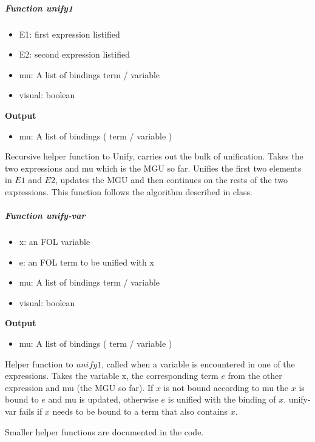 \documentclass[paper=a4, fontsize=11pt]{scrartcl}
\numberwithin{equation}{section}		%
\numberwithin{figure}{section}			%
\numberwithin{table}{section}				%
\begin{document}
\subparagraph{Function unify1}
\begin{itemize}
  \item {E1:} first expression listified
  \item {E2:} second expression listified
  \item {mu:} A list of bindings {term / variable}
  \item {visual:} boolean
\end{itemize}
\noindent\textbf{Output}
\begin{itemize}
    \item{mu:} A list of bindings ( term / variable )
\end{itemize}
Recursive helper function to Unify, carries out the bulk of unification. Takes the two
expressions and mu which is the MGU so far. Unifies the first two elements in
$E1$ and $E2$, updates the MGU and then continues on the rests of the two expressions.
This function follows the algorithm described in class.

\subparagraph{Function unify-var}
\begin{itemize}
  \item {x:} an FOL variable
  \item {e:} an FOL term to be unified with x
  \item {mu:} A list of bindings {term / variable}
  \item {visual:} boolean
\end{itemize}
\noindent\textbf{Output}
\begin{itemize}
    \item{mu:} A list of bindings ( term / variable )
\end{itemize}
Helper function to $unify1$, called when a variable is encountered in one of the
expressions. Takes the variable x, the corresponding term $e$ from the other
expression and mu (the MGU so far). If $x$ is not bound according to mu the $x$
is bound to $e$ and mu is updated, otherwise $e$ is unified with the binding of $x$.
unify-var fails if $x$ needs to be bound to a term that also contains $x$.

Smaller helper functions are documented in the code.
\end{document}
